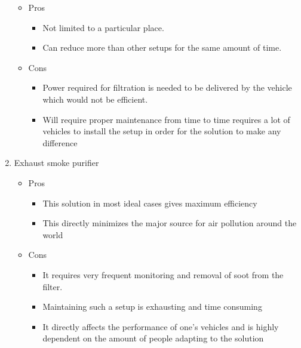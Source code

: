 \documentclass[12pt]{article}
\begin{document}
\begin{enumerate}
\begin{itemize}
\item Pros
\begin{itemize}
\item Not limited to a particular place.
\item Can reduce more than other setups for the same amount of time.
\end{itemize}
\end{itemize}

\begin{itemize}
\item Cons
\begin{itemize}
\item Power required for filtration is needed to be delivered by the vehicle which would not be efficient.
\item Will require proper maintenance from time to time requires a lot of vehicles to install the setup in order for the solution to make any difference
\end{itemize}
\end{itemize}

\item Exhaust smoke purifier

\begin{itemize}
\item Pros
\begin{itemize}
\item This solution in most ideal cases gives maximum efficiency
\item This directly minimizes the major source for air pollution around the world
\end{itemize}
\end{itemize}

\begin{itemize}
\item Cons
\begin{itemize}
\item It requires very frequent monitoring and removal of soot from the filter.
\item Maintaining such a setup is exhausting and time consuming
\item It directly affects the performance of one's vehicles and is highly dependent on the amount of people adapting to the solution
\end{itemize}
\end{itemize}

\end{enumerate}
\end{document}
